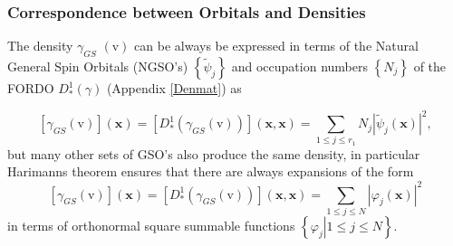 \documentclass[aps,preprint]{revtex4}%
\begin{document}
\subsubsection{Correspondence between Orbitals and Densities}

The density $\gamma_{GS}$ $\left(  \mathrm{v}\right)  $ can be always be
expressed in terms of the Natural General Spin Orbitals (NGSO's) $\left\{
\tilde{\psi}_{j}\right\}  $ and occupation numbers $\left\{  N_{j}\right\}  $
of the FORDO $D_{\ast}^{1}\left(  \gamma\right)  $ (Appendix \ref{Denmat}) as%

\begin{equation}
\left[  \gamma_{GS}\left(  \mathrm{v}\right)  \right]  \left(  \mathbf{x}%
\right)  =\left[  D_{\ast}^{1}\left(  \gamma_{GS}\left(  \mathrm{v}\right)
\right)  \right]  \left(  \mathbf{x,x}\right)  =\sum_{1\leq j\leq r_{1}}%
N_{j}\left\vert \tilde{\psi}_{j}\left(  \mathbf{x}\right)  \right\vert ^{2},
\label{NGSOexpan}%
\end{equation}
but many other sets of GSO's also produce the same density, in particular
Harimanns \cite{Harimann} theorem ensures that there are always expansions of
the form
\begin{equation}
\left[  \gamma_{GS}\left(  \mathrm{v}\right)  \right]  \left(  \mathbf{x}%
\right)  =\left[  D_{\ast}^{1}\left(  \gamma_{GS}\left(  \mathrm{v}\right)
\right)  \right]  \left(  \mathbf{x,x}\right)  =\sum_{1\leq j\leq N}\left\vert
\varphi_{j}\left(  \mathbf{x}\right)  \right\vert ^{2} \label{Genexp}%
\end{equation}
in terms of orthonormal square summable functions $\left\{  \left.
\varphi_{j}\right\vert 1\leq j\leq N\right\}  $.
\end{document}
